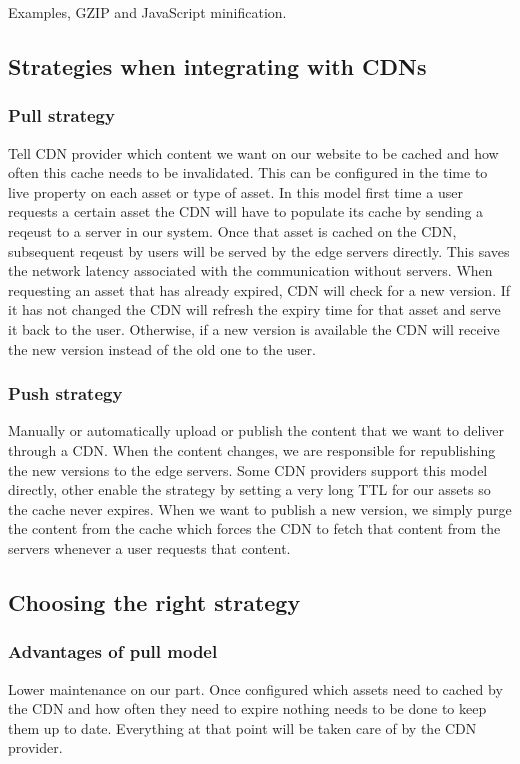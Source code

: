 Examples, GZIP and JavaScript minification.

\subsection{Strategies when integrating with CDNs}

\subsubsection{Pull strategy}
Tell CDN provider which content we want on our website to be cached and how often this cache needs to be invalidated.
This can be configured in the time to live property on each asset or type of asset.
In this model first time a user requests a certain asset the CDN will have to populate its cache by sending a reqeust to a server in our system.
Once that asset is cached on the CDN, subsequent reqeust by users will be served by the edge servers directly.
This saves the network latency associated with the communication without servers.
When requesting an asset that has already expired, CDN will check for a new version.
If it has not changed the CDN will refresh the expiry time for that asset and serve it back to the user.
Otherwise, if a new version is available the CDN will receive the new version instead of the old one to the user.

\subsubsection{Push strategy}
Manually or automatically upload or publish the content that we want to deliver through a CDN.
When the content changes, we are responsible for republishing the new versions to the edge servers.
Some CDN providers support this model directly, other enable the strategy by setting a very long TTL for our assets so the cache never expires.
When we want to publish a new version, we simply purge the content from the cache which forces the CDN to fetch that content from the servers whenever a user requests that content.

\subsection{Choosing the right strategy}

\subsubsection{Advantages of pull model}
Lower maintenance on our part.
Once configured which assets need to cached by the CDN and how often they need to expire nothing needs to be done to keep them up to date.
Everything at that point will be taken care of by the CDN provider.

